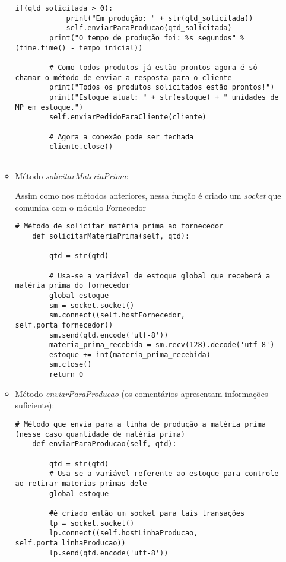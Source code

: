 \documentclass[brazil, a4paper,12pt]{article}
\begin{document}
\begin{enumerate}
\begin{itemize}
\begin{lstlisting}[style=sd]
        if(qtd_solicitada > 0):
            print("Em produção: " + str(qtd_solicitada))
            self.enviarParaProducao(qtd_solicitada)
        print("O tempo de produção foi: %s segundos" %(time.time() - tempo_inicial))

        # Como todos produtos já estão prontos agora é só chamar o método de enviar a resposta para o cliente
        print("Todos os produtos solicitados estão prontos!")
        print("Estoque atual: " + str(estoque) + " unidades de MP em estoque.")
        self.enviarPedidoParaCliente(cliente)

        # Agora a conexão pode ser fechada
        cliente.close()


\end{lstlisting}

\item Método \emph{solicitarMateriaPrima}:

Assim como nos métodos anteriores, nessa função é criado um \emph{socket} que comunica com o módulo Fornecedor

\begin{lstlisting}[style=sd]
# Método de solicitar matéria prima ao fornecedor
    def solicitarMateriaPrima(self, qtd):

        qtd = str(qtd)

        # Usa-se a variável de estoque global que receberá a matéria prima do fornecedor
        global estoque
        sm = socket.socket()
        sm.connect((self.hostFornecedor, self.porta_fornecedor))
        sm.send(qtd.encode('utf-8'))
        materia_prima_recebida = sm.recv(128).decode('utf-8')
        estoque += int(materia_prima_recebida)
        sm.close()
        return 0

\end{lstlisting}

\item Método \emph{enviarParaProducao} (os comentários apresentam informações suficiente):

\begin{lstlisting}[style=sd]
# Método que envia para a linha de produção a matéria prima (nesse caso quantidade de matéria prima)
    def enviarParaProducao(self, qtd):

        qtd = str(qtd)
        # Usa-se a variável referente ao estoque para controle ao retirar materias primas dele
        global estoque

        #é criado então um socket para tais transações
        lp = socket.socket()
        lp.connect((self.hostLinhaProducao, self.porta_linhaProducao))
        lp.send(qtd.encode('utf-8'))


\end{lstlisting}
\end{itemize}
\end{enumerate}
\end{document}
